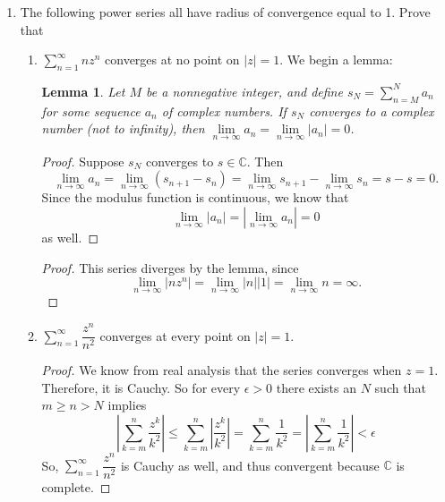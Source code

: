 \documentclass[10pt]{article}
\newcommand{\C}{\mathbb{C}}
\newtheorem*{lem}{Lemma}
\begin{document}
\begin{enumerate}
\begin{proof}
Now, assume the proposition holds for some $N \geq M$.  Since $\sum_{n=M}^{N+1} a_n b_n = \sum_{n=M}^N a_n b_n + a_{N+1}b_{N+1}$, we need to show that $f(N+1) = f(N) + a_{N+1}b_{N+1}$.
\begin{align*}
f(N+1) &= a_{N+1} B_{N+1} - a_M B_{M-1} - \sum_{n=M}^N (a_{n+1} - a_n)B_n
\\
&= a_{N+1} (B_{N} + b_{N+1}) - a_M B_{M-1} - \sum_{n=M}^{N-1} (a_{n+1} - a_n)B_n - (a_{N+1} - a_N)B_N
\\
&= a_{N+1}b_{N+1} - a_M B_{M-1} - \sum_{n=M}^{N-1} (a_{n+1} - a_n)B_n + a_NB_N
\\
&= f(N) + a_{N+1}b_{N+1}
\end{align*}
as desired.
\end{proof}

\item The following power series all have radius of convergence equal to 1.  Prove that
\begin{enumerate}
\item $\sum_{n=1}^\infty n z^n$ converges at no point on $|z|=1$.
We begin a lemma:
\begin{lem}
Let $M$ be a nonnegative integer, and define $s_N = \sum_{n=M}^N a_n$ for some sequence $a_n$ of complex numbers.  If $s_N$ converges to a complex number (not to infinity), then $\lim\limits_{n \rightarrow \infty} a_n = \lim\limits_{n \rightarrow \infty} |a_n| = 0$.
\end{lem}
\begin{proof}
Suppose $s_N$ converges to $s \in \C$.  Then $$\lim\limits_{n \rightarrow \infty} a_n = \lim\limits_{n \rightarrow \infty} (s_{n+1} - s_n) = \lim\limits_{n \rightarrow \infty} s_{n+1} - \lim\limits_{n \rightarrow \infty} s_n = s - s = 0.$$
Since the modulus function is continuous, we know that $$\lim\limits_{n \rightarrow \infty} |a_n| = |\lim\limits_{n \rightarrow \infty} a_n | = 0$$
as well.
\end{proof}
\begin{proof}
This series diverges by the lemma, since $$\lim\limits_{n \rightarrow \infty} |nz^n| = \lim\limits_{n \rightarrow \infty} |n||1| = \lim\limits_{n \rightarrow \infty} n = \infty.$$
\end{proof}

\item $\sum_{n=1}^\infty \dfrac{z^n}{n^2}$ converges at every point on $|z|=1$.
\begin{proof}
We know from real analysis that the series converges when $z = 1$.  Therefore, it is Cauchy.  So for every $\epsilon > 0$ there exists an $N$ such that $m \geq n > N$ implies
$$
\left| \sum_{k=m}^n \dfrac{z^k}{k^2} \right|
\leq
\sum_{k=m}^n \left| \dfrac{z^k}{k^2} \right|
= \sum_{k=m}^n \dfrac{1}{k^2}
= \left| \sum_{k=m}^n \dfrac{1}{k^2} \right|
< \epsilon
$$
So, $\sum_{n=1}^\infty \dfrac{z^n}{n^2}$ is Cauchy as well, and thus convergent because $\C$ is complete.
\end{proof}


\end{enumerate}
\end{enumerate}
\end{document}
